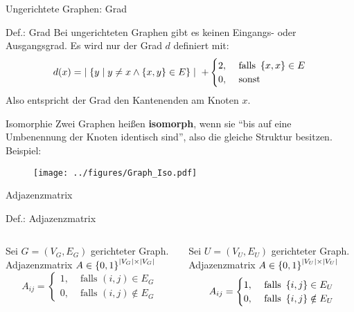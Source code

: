 \begin{frame}{Ungerichtete Graphen: Grad}
	\begin{block}{Def.: Grad}
		Bei ungerichteten Graphen gibt es keinen Eingangs- oder Ausgangsgrad. Es wird nur der Grad $d$ definiert mit:
		\[
			d(x)=\; \mid \left\{ y \mid y \neq x \wedge \left\{ x,y \right\}\in E \right\} \mid \; + 
			\begin{cases} 
				2, & \text{ falls } \left\{ x,x \right\} \in E \\
				0, & \text{ sonst}
			\end{cases}
		\]
		\medskip
		Also entspricht der Grad den Kantenenden am Knoten $x$.
	\end{block}
\end{frame}


\begin{frame}{Isomorphie}
	Zwei Graphen heißen \textbf{isomorph}, wenn sie \enquote{bis auf eine Umbenennung der Knoten identisch sind}, also die gleiche Struktur besitzen.\\

	Beispiel:
	\begin{figure}[H]
		\texttt{[image: ../figures/Graph\_Iso.pdf]}
	\end{figure}
\end{frame}

\begin{frame}{Adjazenzmatrix}
	\begin{block}{Def.: Adjazenzmatrix}
		\begin{columns}
			\begin{column}{0.475\textwidth}
				Sei $G=(V_G,E_G)$ gerichteter Graph.\\
				Adjazenzmatrix $A \in \left\{ 0,1 \right\}^{\mid V_G \mid \times \mid V_G \mid}$\\[12pt]
				\[
					A_{ij} = 
					\begin{cases}
						1, & \text{ falls } (i,j)\in E_G\\
						0, & \text{ falls } (i,j)\notin E_G
					\end{cases}
				\]
			\end{column}
			\begin{column}{0.475\textwidth}
				Sei $U=(V_U,E_U)$ gerichteter Graph.\\
				Adjazenzmatrix $A \in \left\{ 0,1 \right\}^{\mid V_U \mid \times \mid V_U \mid}$\\[12pt]
				\[
					A_{ij} = 
					\begin{cases}
						1, & \text{ falls } \left\{ i,j \right\}\in E_U\\
						0, & \text{ falls } \left\{ i,j \right\}\notin E_U
					\end{cases}
				\]
			\end{column}
		\end{columns}
	\end{block}
\end{frame}


